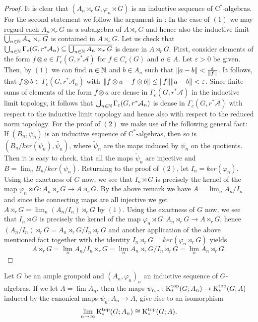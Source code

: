 	\begin{proof}
		It is clear that $(A_n\rtimes_r G,\varphi_n\rtimes G)$ is an inductive sequence of $\mathrm{C}^*$-algebras. For the second statement we follow the argument in \cite[Lemma~2.5]{MR2010742}:
		In the case of $(1)$ we may regard each $A_n\rtimes_r G$ as a subalgebra of $A\rtimes_r G$ and hence also the inductive limit $\overline{\bigcup_{n\in\mathbb N}A_n\rtimes_r G}$ is contained in $A\rtimes_r G$. Let us check that $\bigcup_{n\in\mathbb N} \Gamma_c(G,r^*\mathcal{A}_n)\subseteq \overline{\bigcup_{n\in\mathbb N}A_n\rtimes_r G}$ is dense in $A\rtimes_r G$. First, consider elements of the form $f\otimes a\in \Gamma_c(G,r^*\mathcal{A})$ for $f\in C_c(G)$ and $a\in A$. Let $\varepsilon>0$ be given. Then, by $(1)$ we can find $n\in\mathbb N$ and $b\in A_n$ such that $\lVert a-b\rVert<\frac{\varepsilon}{\lVert f\rVert}$. It follows, that $f\otimes b\in \Gamma_c(G,r^*\mathcal{A}_n)$ with $\lVert f\otimes a-f\otimes b\rVert\leq \lVert f\rVert\lVert a-b\rVert<\varepsilon$. Since finite sums of elements of the form $f\otimes a$ are dense in $\Gamma_c(G,r^*\mathcal{A})$ in the inductive limit topology, it follows that $\bigcup_{n\in\mathbb N}\Gamma_c(G,r^*\mathcal{A}_n)$ is dense in $\Gamma_c(G,r^*\mathcal{A})$ with respect to the inductive limit topology and hence also with respect to the reduced norm topology.
		For the proof of $(2)$ we make use of the following general fact:
		If $(B_n,\psi_n)$ is an inductive sequence of $\mathrm{C}^*$-algebras, then so is $(B_n/ker(\psi_n),\widetilde{\psi_n})$, where $\widetilde{\psi}_n$ are the maps induced by $\psi_n$ on the quotients. Then it is easy to check, that all the maps $\widetilde{\psi}_n$ are injective and $B=\lim_n B_n/ker(\psi_n)$.
		Returning to the proof of $(2)$,
		let $I_n=ker(\varphi_n)$. Using the exactness of $G$ now, we see that $I_n\rtimes G$ is precisely the kernel of the map $\varphi_n \rtimes G:A_n\rtimes_r G\rightarrow A\rtimes_r G$.
		By the above remark we have $A=\lim_n A_n/I_n$ and since the connecting maps are all injective we get $A\rtimes_r G=\lim_n (A_n/I_n)\rtimes_r G$ by $(1)$. Using the exactness of $G$ now, we see that $I_n\rtimes G$ is precisely the kernel of the map $\varphi_n \rtimes G:A_n\rtimes_r G\rightarrow A\rtimes_r G$, hence $(A_n/I_n)\rtimes_r G=A_n\rtimes_r G/I_n\rtimes_r G$ and another application of the above mentioned fact together with the identity $I_n\rtimes_r G=ker(\varphi_n\rtimes_r G)$ yields
		$$A\rtimes_r G	=\lim_n A_n/I_n\rtimes_r G=\lim_n A_n\rtimes_r G/I_n\rtimes_r G=\lim_n A_n\rtimes_r G.$$
	\end{proof}
	\begin{satz}\label{Theorem:Continuity of top. K-theory}
		Let $G$ be an ample groupoid and $(A_n,\varphi_n)_n$ an inductive sequence of $G$-algebras. If we let $A=\lim A_n$, then the maps $\psi_{n,*}:\mathrm K_*^{\mathrm{top}}(G;A_n)\rightarrow \mathrm K_*^{\mathrm{top}}(G;A)$ induced by the canonical maps $\psi_n:A_n\rightarrow A$, give rise to an isomorphism
		$$\lim_{n\rightarrow\infty}\mathrm K_*^{\mathrm{top}}(G;A_n)\cong \mathrm K_*^{\mathrm{top}}(G;A).$$
	\end{satz}

